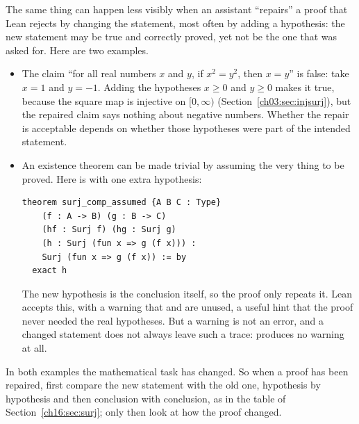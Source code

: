 The same thing can happen less visibly when an assistant ``repairs'' a proof that Lean rejects by changing the statement, most often by adding a hypothesis: the new statement may be true and correctly proved, yet not be the one that was asked for. Here are two examples.
\begin{itemize}
\item The claim ``for all real numbers $x$ and $y$, if $x^2=y^2$, then $x=y$'' is false: take $x=1$ and $y=-1$. Adding the hypotheses $x\ge0$ and $y\ge0$ makes it true, because the square map is injective on $[0,\infty)$ (Section~\ref{ch03:sec:injsurj}), but the repaired claim says nothing about negative numbers. Whether the repair is acceptable depends on whether those hypotheses were part of the intended statement.
\item An existence theorem can be made trivial by assuming the very thing to be proved. Here is  with one extra hypothesis:
\par\noindent\begin{minipage}{\linewidth}
\begin{lstlisting}
theorem surj_comp_assumed {A B C : Type}
    (f : A -> B) (g : B -> C)
    (hf : Surj f) (hg : Surj g)
    (h : Surj (fun x => g (f x))) :
    Surj (fun x => g (f x)) := by
  exact h
\end{lstlisting}
\end{minipage}\par
The new hypothesis  is the conclusion itself, so the proof only repeats it. Lean accepts this, with a warning that  and  are unused, a useful hint that the proof never needed the real hypotheses. But a warning is not an error, and a changed statement does not always leave such a trace:  produces no warning at all.
\end{itemize}
In both examples the mathematical task has changed. So when a proof has been repaired, first compare the new statement with the old one, hypothesis by hypothesis and then conclusion with conclusion, as in the table of Section~\ref{ch16:sec:surj}; only then look at how the proof changed.
